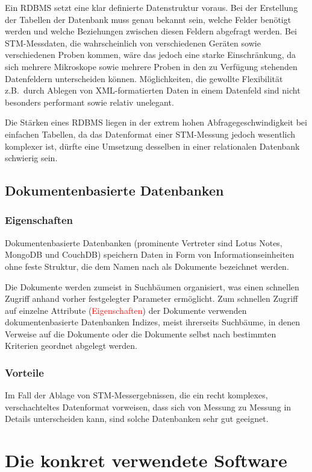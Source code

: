 \documentclass[12pt,ngerman,a4]{scrartcl}
\newcommand{\annot}[1]{{\textcolor{red}{#1}}}%
\begin{document}
Ein RDBMS setzt eine klar definierte Datenstruktur voraus. Bei der Erstellung der Tabellen der Datenbank muss genau bekannt sein, welche Felder benötigt werden und welche Beziehungen zwischen diesen Feldern abgefragt werden. Bei STM-Messdaten, die wahrscheinlich von verschiedenen Geräten sowie verschiedenen Proben kommen, wäre das jedoch eine starke Einschränkung, da sich mehrere Mikroskope sowie mehrere Proben in den zu Verfügung stehenden Datenfeldern unterscheiden können. Möglichkeiten, die gewollte Flexibilität z.B.\ durch Ablegen von XML-formatierten Daten in einem Datenfeld sind nicht besonders performant sowie relativ unelegant.

Die Stärken eines RDBMS liegen in der extrem hohen Abfragegeschwindigkeit bei einfachen Tabellen, da das Datenformat einer STM-Messung jedoch wesentlich komplexer ist, dürfte eine Umsetzung desselben in einer relationalen Datenbank schwierig sein.
\subsection{Dokumentenbasierte Datenbanken}
\subsubsection{Eigenschaften}
Dokumentenbasierte Datenbanken (prominente Vertreter sind Lotus Notes, MongoDB und CouchDB) speichern Daten in Form von Informationseinheiten ohne feste Struktur, die dem Namen nach als Dokumente bezeichnet werden.

Die Dokumente werden zumeist in Suchbäumen organisiert, was einen schnellen Zugriff anhand vorher festgelegter Parameter ermöglicht. Zum schnellen Zugriff auf einzelne Attribute (\annot{Eigenschaften}) der Dokumente verwenden dokumentenbasierte Datenbanken Indizes, meist ihrerseits Suchbäume, in denen Verweise auf die Dokumente oder die Dokumente selbst nach bestimmten Kriterien geordnet abgelegt werden.
\subsubsection{Vorteile}
Im Fall der Ablage von STM-Messergebnissen, die ein recht komplexes, verschachteltes Datenformat vorweisen, dass sich von Messung zu Messung in Details unterscheiden kann, sind solche Datenbanken sehr gut geeignet.

\section{Die konkret verwendete Software}
\end{document}

